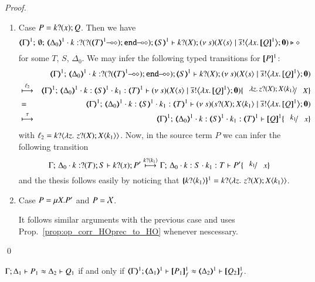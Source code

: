 \begin{proof}
\begin{enumerate}[1.]
	\item	Case $P = k ? (x) ; Q$.
		Then we have
%
		\[
			\mapt{\Gamma}^{1};\, \emptyset;\, \mapt{\Delta_0}^{1} \cat 
			k: \btinp{\lhot{\btinp{\lhot{\tmap{T}{1}}}\tinact}} \tmap{S}{1}
			\proves
			\binp{k}{X} \newsp{s}{\appl{X}{s} \Par \bbout{\dual{s}}{\abs{x}{\pmap{Q}{1}}} \inact}
			\hastype \Proc
		\]
%
		for some $T$, $S$, $\Delta_0$.
		We may infer the following typed transitions for $[\!\![P]\!\!]^{1}$:
%
		\begin{eqnarray*}
			& & 
			\mapt{\Gamma}^{1};\, %
			\mapt{\Delta_0}^{1} \cat 
			k: \btinp{\lhot{\btinp{\lhot{\tmap{T}{1}}}\tinact}} \tmap{S}{1}
			\proves
			\binp{k}{X} \newsp{s}{\appl{X}{s} \Par \bbout{\dual{s}}{\abs{x}{\pmap{Q}{1}}} \inact} \\
			& \hby{\ell_2} & 
			\mapt{\Gamma}^{1};\, %
			\mapt{\Delta_0}^{1} \cat 
			k:\tmap{S}{1}
			\cat k_1:\tmap{T}{1}
			\proves
			\newsp{s}{\appl{X}{s} \Par \bbout{\dual{s}}{\abs{x}{\pmap{Q}{1}}} \inact} \subst{\abs{z}\binp{z}{X}\appl{X}{k_1}}{X} \\
			& = & 
			\mapt{\Gamma}^{1};\, %
			\mapt{\Delta_0}^{1} 
			\cat k:\tmap{S}{1}
			\cat k_1:\tmap{T}{1}
			\proves
			\newsp{s}{\binp{s}{X}\appl{X}{k_1} \Par \bbout{\dual{s}}{\abs{x}{\pmap{Q}{1}}} \inact}  \\
			& \hby{\tau} & 
			\mapt{\Gamma}^{1};\, %
			\mapt{\Delta_0}^{1} 
			\cat k:\tmap{S}{1}
			\cat k_1:\tmap{T}{1}
			\proves
			\pmap{Q}{1}\subst{k_1}{x}   
		\end{eqnarray*}
%
		with $\ell_2 = k ? \langle \lambda z.\,\,z ? (X) ; X\langle k_1 \rangle \rangle$.
		Now, in the source term $P$ we can infer the following transition 
%
		\[
			\Gamma;\,  \Delta_0 \cat k:\btinp{T} S \proves \binp{k}{x} P'
			\hby{\bactinp{k}{k_1}} 
			\Gamma;\,  \Delta_0 \cat k: S \cat k_1: T \proves P'\subst{k_1}{x}
		\]
%
		and the thesis follows easily by noticing that 
		$\{\!\!\{k ? \langle k_1 \rangle\}\!\!\}^{1} = k ? \langle \lambda z.\,\,z ? (X) ; X\langle k_1 \rangle \rangle$.

	\item	Case $P =\mu X. P'$ and $P = \mathcal{X}$.

		It follows similar arguments with the previous case
		and uses Prop.~\ref{prop:op_corr_HOprec_to_HO} whenever nescessary.
\end{enumerate}
\qed
\end{proof}


\begin{proposition}\rm
	$\Gamma; \Delta_1 \vdash P_1 \approx \Delta_2 \vdash Q_1$
	if and only if
	$\horel{\mapt{\Gamma}^{1}}{\mapt{\Delta_1}^{1}}{\pmapp{P_1}{1}{f}}{\wb}{\mapt{\Delta_2}^{1}}{\pmapp{Q_2}{1}{f}}$.
\end{proposition}

